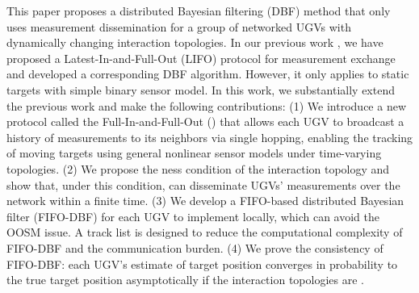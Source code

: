 	\textcolor{\revcol}{
	This paper proposes a distributed Bayesian filtering (DBF) method that only uses measurement dissemination for a group of networked UGVs with dynamically changing interaction topologies. 
	In our previous work \cite{liu2016distributed}, we have proposed a Latest-In-and-Full-Out (LIFO) protocol for measurement exchange and developed a corresponding DBF algorithm.
	However, it only applies to static targets with simple binary sensor model.
	In this work, we substantially extend the previous work and make the following contributions:
	(1) We introduce a new protocol called the Full-In-and-Full-Out (\proto) that allows each UGV to broadcast a history of measurements to its neighbors via single hopping, enabling the tracking of moving targets using general nonlinear sensor models under time-varying topologies. 
	(2) We propose the {\fc ness} condition of the interaction topology and show that, under this condition, {\proto} can disseminate UGVs' measurements over the network within a finite time.
	(3) We develop a FIFO-based distributed Bayesian filter (FIFO-DBF) for each UGV to implement locally, which can avoid the OOSM issue.
	A track list is designed to reduce the computational complexity of FIFO-DBF and the communication burden. 
	(4) We prove the consistency of FIFO-DBF: each UGV's estimate of target position converges in probability to the true target position asymptotically if the interaction topologies are \fc.}
	
